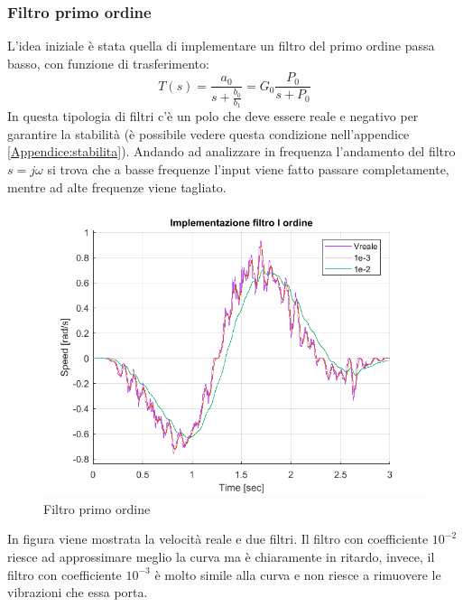 \subsubsection*{Filtro primo ordine}
L'idea iniziale è stata quella di implementare un filtro del primo ordine passa basso, con funzione di trasferimento:
\begin{equation}
T(s) = \frac{a_0}{s+\frac{b_0}{b_1}} = G_0 \frac{P_0}{s+P_0}
\end{equation}
In questa tipologia di filtri c'è un polo che deve essere reale e negativo per garantire la stabilità (è possibile vedere questa condizione nell'appendice \ref{Appendice:stabilita}). Andando ad analizzare in frequenza l'andamento del filtro $s=j\omega$ si trova che a basse frequenze l'input viene fatto passare completamente, mentre ad alte frequenze viene tagliato.
\begin{figure}[ht]
	\begin{center}
		\includegraphics[scale=0.5]{Immagini/Traiettorie/FiltroIOrdine}
		\caption{Filtro primo ordine}
		\label{fig:filtroIOrd}
	\end{center}
\end{figure}
In figura viene mostrata la velocità reale e due filtri. Il filtro con coefficiente $10^{-2}$ riesce ad approssimare meglio la curva ma è chiaramente in ritardo, invece, il filtro con coefficiente $10^{-3}$ è molto simile alla curva e non riesce a rimuovere le vibrazioni che essa porta.
